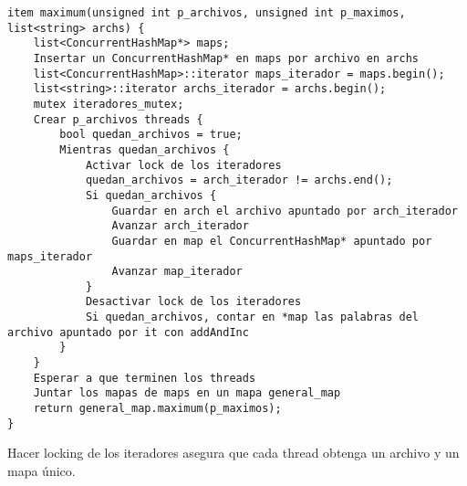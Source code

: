 \begin{verbatim}
item maximum(unsigned int p_archivos, unsigned int p_maximos, list<string> archs) {
	list<ConcurrentHashMap*> maps;
	Insertar un ConcurrentHashMap* en maps por archivo en archs
	list<ConcurrentHashMap>::iterator maps_iterador = maps.begin();
	list<string>::iterator archs_iterador = archs.begin();
	mutex iteradores_mutex;
	Crear p_archivos threads {
		bool quedan_archivos = true;
		Mientras quedan_archivos {
			Activar lock de los iteradores
			quedan_archivos = arch_iterador != archs.end();
			Si quedan_archivos {
				Guardar en arch el archivo apuntado por arch_iterador
				Avanzar arch_iterador
				Guardar en map el ConcurrentHashMap* apuntado por maps_iterador
				Avanzar map_iterador
			}
			Desactivar lock de los iteradores
			Si quedan_archivos, contar en *map las palabras del archivo apuntado por it con addAndInc
		}
	}
	Esperar a que terminen los threads
	Juntar los mapas de maps en un mapa general_map
	return general_map.maximum(p_maximos);
}
\end{verbatim}

Hacer locking de los iteradores asegura que cada thread obtenga un archivo y un mapa único.